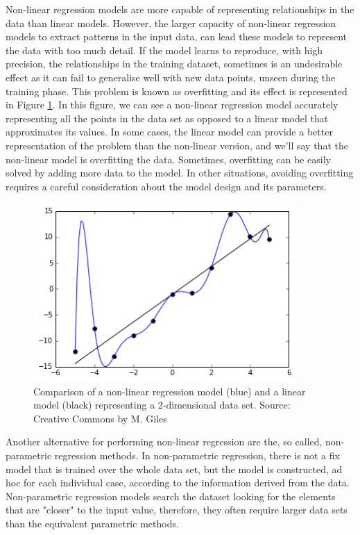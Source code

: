 Non-linear regression models are more capable of representing relationships in the data than linear models. However, the larger capacity of non-linear regression models to extract patterns in the input data, can lead these models to represent the data with too much detail. If the model learns to reproduce, with high precision, the relationships in the training dataset, sometimes is an undesirable effect as it can fail to generalise well with new data points, unseen during the training phase. This problem is known as overfitting \citep{hawkins2004problem} and its effect is represented in Figure \ref{overfitting}. In this figure, we can see a non-linear regression model accurately representing all the points in the data set as opposed to a linear model that approximates its values. In some cases, the linear model can provide a better representation of the problem than the non-linear version, and we'll say that the non-linear model is overfitting the data. Sometimes, overfitting can be easily solved by adding more data to the model. In other situations, avoiding overfitting requires a careful consideration about the model design and its parameters.

\medskip

\begin{figure}[h]
 \centerline{\includegraphics[width=10cm]{overfitting.png}} \caption{Comparison of a non-linear regression model (blue) and a linear model (black) representing a 2-dimensional data set. Source: Creative Commons by M. Giles}\label{overfitting}
\end{figure}

Another alternative for performing non-linear regression are the, so called, non-parametric regression methods. In non-parametric regression, there is not a fix model that is trained over the whole data set, but the model is constructed, ad hoc for each individual case, according to the information derived from the data. Non-parametric regression models search the dataset looking for the elements that are "closer" to the input value, therefore, they often require larger data sets than the equivalent parametric methods. 


